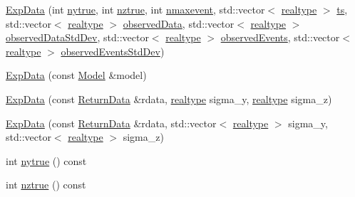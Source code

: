 \begin{DoxyCompactItemize}
\mbox{\hyperlink{classamici_1_1_exp_data_a3b747fc65e60e76d84831831eb7b8f49}{Exp\+Data}} (int \mbox{\hyperlink{classamici_1_1_exp_data_ac2657ffc58ee1ea80d6c4db40010e942}{nytrue}}, int \mbox{\hyperlink{classamici_1_1_exp_data_a9e9b6341842d8860b0114faa4e0c97ee}{nztrue}}, int \mbox{\hyperlink{classamici_1_1_exp_data_ae6996d31ed94180a4b1d79412eb5ce31}{nmaxevent}}, std\+::vector$<$ \mbox{\hyperlink{namespaceamici_a1bdce28051d6a53868f7ccbf5f2c14a3}{realtype}} $>$ \mbox{\hyperlink{classamici_1_1_exp_data_aa7014a80e7b102f85a10e3b9a480e8e5}{ts}}, std\+::vector$<$ \mbox{\hyperlink{namespaceamici_a1bdce28051d6a53868f7ccbf5f2c14a3}{realtype}} $>$ \mbox{\hyperlink{classamici_1_1_exp_data_a6acedf749a3c5e4c4dcbc822f58a565d}{observed\+Data}}, std\+::vector$<$ \mbox{\hyperlink{namespaceamici_a1bdce28051d6a53868f7ccbf5f2c14a3}{realtype}} $>$ \mbox{\hyperlink{classamici_1_1_exp_data_aa097568cebb4be48c4c1dfaab0c2a159}{observed\+Data\+Std\+Dev}}, std\+::vector$<$ \mbox{\hyperlink{namespaceamici_a1bdce28051d6a53868f7ccbf5f2c14a3}{realtype}} $>$ \mbox{\hyperlink{classamici_1_1_exp_data_a629e6085839e16bac95ef0eba580f7f0}{observed\+Events}}, std\+::vector$<$ \mbox{\hyperlink{namespaceamici_a1bdce28051d6a53868f7ccbf5f2c14a3}{realtype}} $>$ \mbox{\hyperlink{classamici_1_1_exp_data_abb12a8f75b4e6c936ae6c0be770628c9}{observed\+Events\+Std\+Dev}})
\item 
\mbox{\hyperlink{classamici_1_1_exp_data_af4ce16765488e3857131aa5aea0c38b4}{Exp\+Data}} (const \mbox{\hyperlink{classamici_1_1_model}{Model}} \&model)
\item 
\mbox{\hyperlink{classamici_1_1_exp_data_a30619c6fa4a5f5cc07e7dcc0824aa0fc}{Exp\+Data}} (const \mbox{\hyperlink{classamici_1_1_return_data}{Return\+Data}} \&rdata, \mbox{\hyperlink{namespaceamici_a1bdce28051d6a53868f7ccbf5f2c14a3}{realtype}} sigma\+\_\+y, \mbox{\hyperlink{namespaceamici_a1bdce28051d6a53868f7ccbf5f2c14a3}{realtype}} sigma\+\_\+z)
\item 
\mbox{\hyperlink{classamici_1_1_exp_data_ac1cf98522f4ac1b25f33b6b3fdd69d95}{Exp\+Data}} (const \mbox{\hyperlink{classamici_1_1_return_data}{Return\+Data}} \&rdata, std\+::vector$<$ \mbox{\hyperlink{namespaceamici_a1bdce28051d6a53868f7ccbf5f2c14a3}{realtype}} $>$ sigma\+\_\+y, std\+::vector$<$ \mbox{\hyperlink{namespaceamici_a1bdce28051d6a53868f7ccbf5f2c14a3}{realtype}} $>$ sigma\+\_\+z)
\item 
int \mbox{\hyperlink{classamici_1_1_exp_data_ac2657ffc58ee1ea80d6c4db40010e942}{nytrue}} () const
\item 
int \mbox{\hyperlink{classamici_1_1_exp_data_a9e9b6341842d8860b0114faa4e0c97ee}{nztrue}} () const

\end{DoxyCompactItemize}
